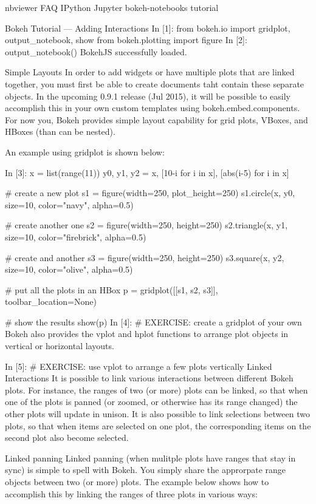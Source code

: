 nbviewer
FAQ
IPython
Jupyter
bokeh-notebooks   tutorial
 	
Bokeh Tutorial — Adding Interactions
In [1]:
from bokeh.io import gridplot, output_notebook, show
from bokeh.plotting import figure
In [2]:
output_notebook()
BokehJS successfully loaded.


Simple Layouts
In order to add widgets or have multiple plots that are linked together, you must first be able to create documents taht contain these separate objects. In the upcoming 0.9.1 release (Jul 2015), it will be possible to easily accomplish this in your own custom templates using bokeh.embed.components. For now you, Bokeh provides simple layout capability for grid plots, VBoxes, and HBoxes (than can be nested).

An example using gridplot is shown below:

In [3]:
x = list(range(11))
y0, y1, y2 = x, [10-i for i in x], [abs(i-5) for i in x]

# create a new plot
s1 = figure(width=250, plot_height=250)
s1.circle(x, y0, size=10, color="navy", alpha=0.5)

# create another one
s2 = figure(width=250, height=250)
s2.triangle(x, y1, size=10, color="firebrick", alpha=0.5)

# create and another
s3 = figure(width=250, height=250)
s3.square(x, y2, size=10, color="olive", alpha=0.5)

# put all the plots in an HBox
p = gridplot([[s1, s2, s3]], toolbar_location=None)

# show the results
show(p)
In [4]:
# EXERCISE: create a gridplot of your own
Bokeh also provides the vplot and hplot functions to arrange plot objects in vertical or horizontal layouts.

In [5]:
# EXERCISE: use vplot to arrange a few plots vertically
Linked Interactions
It is possible to link various interactions between different Bokeh plots. For instance, the ranges of two (or more) plots can be linked, so that when one of the plots is panned (or zoomed, or otherwise has its range changed) the other plots will update in unison. It is also possible to link selections between two plots, so that when items are selected on one plot, the corresponding items on the second plot also become selected.

Linked panning
Linked panning (when mulitple plots have ranges that stay in sync) is simple to spell with Bokeh. You simply share the approrpate range objects between two (or more) plots. The example below shows how to accomplish this by linking the ranges of three plots in various ways:

